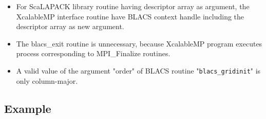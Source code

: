 \begin{itemize}
\item For ScaLAPACK library routine having descriptor array as argument,
      the XcalableMP interface routine have BLACS context handle including 
      the descriptor array as new argument.
\item The blacs\_exit routine is unnecessary, because XcalableMP program executes process 
      corresponding to MPI\_Finalize routines.
\item A valid value of the argument "order" of BLACS routine "{\tt blacs\_gridinit}" is 
      only column-major. 
\end{itemize}

\subsection*{Example}
